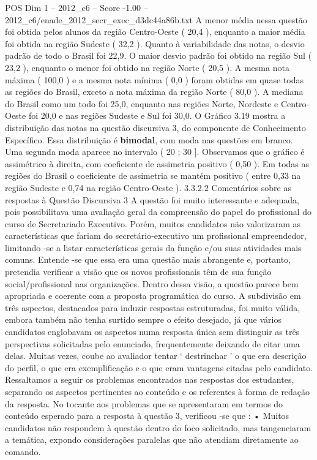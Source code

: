 \begin{textsample}{POS Dim 1 – 2012\_c6 – Score -1.00 – 2012\_c6/enade\_2012\_secr\_exec\_d3dc44a86b.txt}
A menor média nessa questão foi obtida pelos alunos da região Centro-Oeste ( 20,4 ), enquanto a maior média foi obtida na região Sudeste ( 32,2 ).
Quanto à variabilidade das notas, o desvio padrão de todo o Brasil foi 22,9.
O maior desvio padrão foi obtido na região Sul ( 23,2 ), enquanto o menor foi obtido na região Norte ( 20,5 ).
A mesma nota máxima ( 100,0 ) e a mesma nota mínima ( 0,0 ) foram obtidas em quase todas as regiões do Brasil, exceto a nota máxima da região Norte ( 80,0 ).
A mediana do Brasil como um todo foi 25,0, enquanto nas regiões Norte, Nordeste e Centro-Oeste foi 20,0 e nas regiões Sudeste e Sul foi 30,0.
O Gráfico 3.19 mostra a distribuição das notas na questão discursiva 3, do componente de Conhecimento Específico.
Essa distribuição é \textbf{bimodal}, com moda nas questões em branco.
Uma segunda moda aparece no intervalo ( 20 ; 30 ].
Observamos que o gráfico é assimétrico à direita, com coeficiente de assimetria positivo ( 0,50 ).
Em todas as regiões do Brasil o coeficiente de assimetria se mantém positivo ( entre 0,33 na região Sudeste e 0,74 na região Centro-Oeste ). 3.3.2.2 Comentários sobre as respostas à Questão Discursiva 3 A questão foi muito interessante e adequada, pois possibilitava uma avaliação geral da compreensão do papel do profissional do curso de Secretariado Executivo.
Porém, muitos candidatos não valorizaram as características que fariam do secretário-executivo um profissional empreendedor, limitando -se a listar características gerais da função e/ou suas atividades mais comuns.
Entende -se que essa era uma questão mais abrangente e, portanto, pretendia verificar a visão que os novos profissionais têm de sua função social/profissional nas organizações.
Dentro dessa visão, a questão parece bem apropriada e coerente com a proposta programática do curso.
A subdivisão em três aspectos, destacados para induzir respostas estruturadas, foi muito válida, embora também não tenha surtido sempre o efeito desejado, já que vários candidatos englobavam os aspectos numa resposta única sem distinguir as três perspectivas solicitadas pelo enunciado, frequentemente deixando de citar uma delas.
Muitas vezes, coube ao avaliador tentar ‘ destrinchar ’ o que era descrição do perfil, o que era exemplificação e o que eram vantagens citadas pelo candidato.
Ressaltamos a seguir os problemas encontrados nas respostas dos estudantes, separando os aspectos pertinentes ao conteúdo e os referentes à forma de redação da resposta.
No tocante aos problemas que se apresentaram em termos do conteúdo esperado para a resposta à questão 3, verificou -se que : • Muitos candidatos não respondem à questão dentro do foco solicitado, mas tangenciaram a temática, expondo considerações paralelas que não atendiam diretamente ao comando.

\end{textsample}
